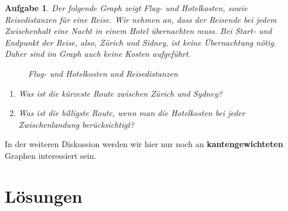 \documentclass[12pt,a4paper]{report}
\theoremstyle{break}
\newtheorem{exercise}{Aufgabe}[chapter]
\theoremstyle{plain}
\begin{document}
\begin{exercise}\label{extravel}
Der folgende Graph zeigt Flug- und Hotelkosten, sowie Reisedistanzen
f\"{u}r eine Reise. Wir nehmen an, dass der Reisende bei jedem Zwischenhalt eine Nacht in einem Hotel \"{u}bernachten muss.
Bei Start- und Endpunkt der Reise, also, Z\"urich und Sidney, ist keine \"{U}bernachtung n\"{o}tig. Daher sind im Graph auch 
keine Kosten aufgef\"{u}hrt.
\begin{figure}[H]
\centerline{
}
\caption{Flug- und Hotelkosten und Reisedistanzen}
\end{figure}
\begin{enumerate}
\item Was ist die \emph{k\"{u}rzeste} Route zwischen Z\"{u}rich und
    Sydney?
\item Was ist die \emph{billigste} Route, wenn man die Hotelkosten bei jeder Zwischenlandung ber\"ucksichtigt?
\end{enumerate}
\end{exercise}

In der weiteren Diskussion werden wir hier nur noch an
\textbf{kantengewichteten} Graphen interessiert sein. 

\newpage
\section{L\"{o}sungen}
\end{document}
